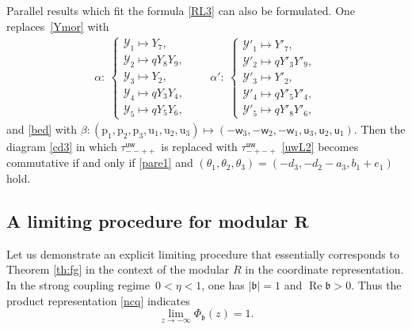 \documentclass[pdftex]{sigma}
\newcommand{\bb}{{\mathfrak b}}
\newcommand{\uu}{{\mathsf u}}
\newcommand{\ww}{{\mathsf w}}
\numberwithin{equation}{section}
\begin{document}
\begin{Remark}
Parallel results which fit the formula \eqref{RL3} can also be formulated.
One replaces~\eqref{Ymor} with
\begin{align*}%
\alpha\colon\ \begin{cases}
\mathscr{Y}_1 \mapsto Y_7,
\\
\mathscr{Y}_2 \mapsto q Y_8Y_9,
\\
\mathscr{Y}_3 \mapsto Y_2,
\\
\mathscr{Y}_4 \mapsto q Y_3Y_4,
\\
\mathscr{Y}_5 \mapsto qY_5Y_6,
\end{cases}
\qquad
\alpha'\colon\ \begin{cases}
\mathscr{Y}'_1 \mapsto Y'_7,
\\
\mathscr{Y}'_2 \mapsto q Y'_3Y'_9,
\\
\mathscr{Y}'_3 \mapsto Y'_2,
\\
\mathscr{Y}'_4 \mapsto q Y'_5Y'_4,
\\
\mathscr{Y}'_5 \mapsto qY'_8Y'_6,
\end{cases}
\end{align*}
and \eqref{bed} with
$\beta\colon
(\mathrm{p}_1,\mathrm{p}_2,\mathrm{p}_3,\mathrm{u}_1,\mathrm{u}_2,\mathrm{u}_3)
\mapsto (-\ww_3,-\ww_2,-\ww_1,\uu_3,\uu_2,\uu_1)$. Then the diagram \eqref{cd3}
in which $\tau^{\uu\ww}_{--++}$ is replaced with $\tau^{\uu\ww}_{-+-+}$
\eqref{uwL2} becomes commutative if and only if \eqref{pare1} and $(\theta_1,\theta_2, \theta_3)=(-d_3, -d_2-a_3, b_1+e_1)$ hold.
\end{Remark}

\subsection[A limiting procedure for modular R]{A limiting procedure for modular $\boldsymbol{R}$}\label{ss:fg}

Let us demonstrate an explicit limiting procedure that essentially corresponds to
Theorem \ref{th:fg} in the context of the modular $R$ in the coordinate representation.
%
In the strong coupling regime~${0<\eta<1}$, one has $|\bb|=1$ and
$\mathop{\operatorname{Re}} \bb >0$. Thus the product representation
\eqref{ncq} indicates
\begin{equation}\label{plim}
\lim_{z \rightarrow -\infty}\Phi_\bb(z) = 1.
\end{equation}
\end{document}
